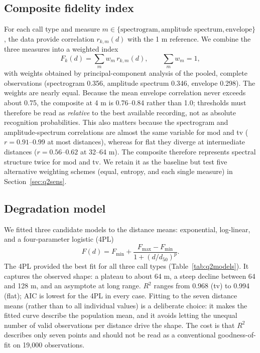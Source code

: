 \documentclass{apmcmthesis}
\begin{document}
\subsection{Composite fidelity index}
For each call type and measure $m\in\{\text{spectrogram},\text{amplitude spectrum},\text{envelope}\}$,
the data provide correlation $r_{k,m}(d)$ with the 1 m reference. We combine the three
measures into a weighted index
\begin{equation}
F_k(d)=\sum_{m} w_m\,r_{k,m}(d),\qquad \sum_m w_m=1,
\end{equation}
with weights obtained by principal-component analysis of the pooled, complete observations
(spectrogram 0.356, amplitude spectrum 0.346, envelope 0.298). The weights are nearly equal.
Because the mean envelope correlation never exceeds about 0.75, the composite at 4 m is
0.76--0.84 rather than 1.0; thresholds must therefore be read as \emph{relative} to the best
available recording, not as absolute recognition probabilities.
This also matters because the spectrogram and amplitude-spectrum correlations are almost the same
variable for mod and tv ($r=0.91$--$0.99$ at most distances), whereas for flat they diverge at
intermediate distances ($r=0.56$--$0.62$ at 32--64 m). The composite therefore represents
spectral structure twice for mod and tv. We retain it as the baseline but test five alternative
weighting schemes (equal, entropy, and each single measure) in Section~\ref{sec:q2sens}.

\subsection{Degradation model}
We fitted three candidate models to the distance means: exponential, log-linear, and a
four-parameter logistic (4PL)
\begin{equation}
F(d)=F_{\min}+\frac{F_{\max}-F_{\min}}{1+(d/d_{50})^{p}}.
\end{equation}
The 4PL provided the best fit for all three call types (Table~\ref{tab:q2models}). It captures
the observed shape: a plateau to about 64 m, a steep decline between 64 and 128 m, and an
asymptote at long range. $R^2$ ranges from 0.968 (tv) to 0.994 (flat); AIC is lowest for the 4PL
in every case. Fitting to the seven distance means (rather than to all individual values) is a
deliberate choice: it makes the fitted curve describe the population mean, and it avoids
letting the unequal number of valid observations per distance drive the shape. The cost is that
$R^2$ describes only seven points and should not be read as a conventional goodness-of-fit on
19{,}000 observations.
\end{document}
